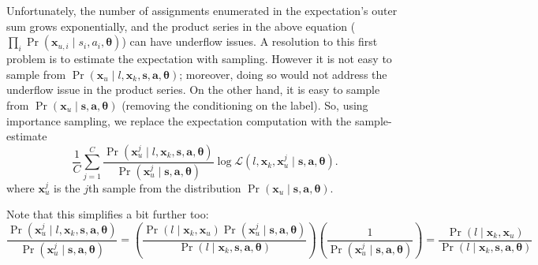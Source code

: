 Unfortunately, 
the number of assignments enumerated in the expectation's outer sum
grows exponentially, and the product series in the above equation
($\prod_i \Pr(\bm{x}_{u,i} \mid s_i, a_i, \bm{\theta})$) can have
underflow issues.  A resolution to this first problem is to estimate
the expectation with sampling.  However
it is not easy to sample from $\Pr(\bm{x}_u \mid l, \bm{x}_k, \bm{s}, 
\bm{a}, \bm{\theta})$; moreover, doing so would not address the
underflow issue in the product series.  On the other hand, it is easy
to sample from $\Pr(\bm{x}_u \mid \bm{s}, \bm{a}, \bm{\theta})$
(removing the conditioning on the label).
%
%
So, using importance sampling, we replace the expectation computation
with the sample-estimate
\begin{equation}
\frac{1}{C} \sum_{j=1}^C \frac{\Pr(\bm{x}_u^j \mid l, \bm{x}_k, \bm{s}, \bm{a}, \bm{\theta})}{\Pr(\bm{x}_u^j \mid \bm{s}, \bm{a}, \bm{\theta})} \log\mathcal{L}(l, \bm{x}_k, \bm{x}_u^j \mid \bm{s}, \bm{a}, \bm{\theta}).
\end{equation}
where $\bm{x}_u^j$ is the $j$th sample from the distribution $\Pr(\bm{x}_u \mid \bm{s}, \bm{a}, \bm{\theta})$.

Note that this simplifies a bit further too:
\begin{equation*}
\frac{\Pr(\bm{x}_u^j \mid l, \bm{x}_k, \bm{s}, \bm{a}, \bm{\theta})}{\Pr(\bm{x}_u^j \mid \bm{s}, \bm{a}, \bm{\theta})} 
= \left( \frac{\Pr(l \mid \bm{x}_k, \bm{x}_u) \Pr(\bm{x}_u^j \mid \bm{s}, \bm{a}, \bm{\theta}) }{\Pr(l \mid \bm{x}_k, \bm{s}, \bm{a}, \bm{\theta})} \right) \left( \frac{1}{\Pr(\bm{x}_u^j \mid \bm{s}, \bm{a}, \bm{\theta})} \right)
= \frac{\Pr(l \mid \bm{x}_k, \bm{x}_u)}{\Pr(l \mid \bm{x}_k, \bm{s}, \bm{a}, \bm{\theta})}
\end{equation*}


